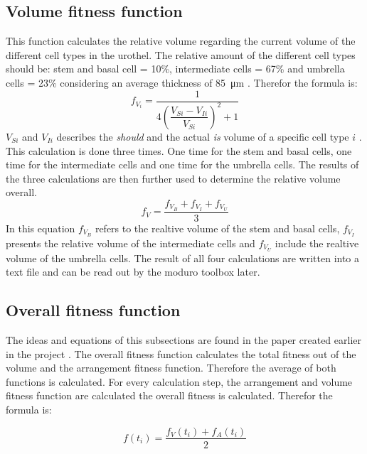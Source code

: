 \subsection{Volume fitness function} \label{subsec:VolumeFitness}
This function calculates the relative volume regarding the current volume of the different cell types in the urothel. The relative amount of the different cell types should be: stem and basal cell = 10\%, intermediate cells = 67\% and umbrella cells = 23\% considering an average thickness of \SI{85}{\micro\metre} \cite{Torelli2017}. Therefor the formula is:
\begin{equation}\label{eq:VolumeFitnessSpecific}
f_{V_{i}} = \dfrac{1}{4 (\dfrac{V_{Si}-V_{Ii}}{V_{Si}})^2 + 1}
\end{equation}
$V_{Si}$ and $V_{Ii}$ describes the \textit{should} and the actual \textit{is} volume of a specific cell type $i$ \cite{Torelli2017}.  This calculation is done three times. One time for the stem and basal cells, one time for the intermediate cells and one time for the umbrella cells. The results of the three calculations are then further used to determine the relative volume overall.
\begin{equation}\label{eq:VolumeFitnessOverall}
f_{V} = \dfrac{f_{V_{B}} + f_{V_{I}} + f_{V_{U}}}{3}
\end{equation}
In this equation $f_{V_{B}}$ refers to the realtive volume of the stem and basal cells, $f_{V_{I}}$ presents the relative volume of the intermediate cells and $f_{V_{U}}$ include the realtive volume of the umbrella cells. \newline
The result of all four calculations are written into a text file and can be read out by the moduro toolbox later.

\subsection{Overall fitness function}
The ideas and equations of this subsections are found in the paper created earlier in the project \cite{Torelli2017}. \newline
The overall fitness function calculates the total fitness out of the volume and the arrangement fitness function. Therefore the average of both functions is calculated. For every calculation step, the arrangement and volume fitness function are calculated the overall fitness is calculated. Therefor the formula is:

\begin{equation} 
f(t_{i}) = \dfrac{f_{V}(t_{i})+f_{A}(t_{i})}{2}
\end{equation}

